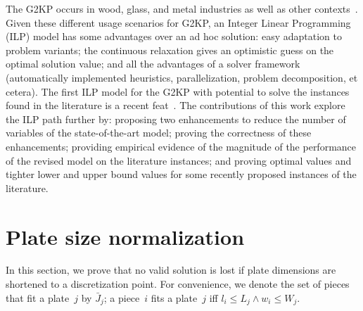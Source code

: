 \documentclass[runningheads]{llncs}
\begin{document}
The G2KP occurs in wood, glass, and metal industries as well as other contexts~\cite[p. 6]{dimitri_thesis}.
Given these different usage scenarios for G2KP, an Integer Linear Programming (ILP) model has some advantages over an ad hoc solution: easy adaptation to problem variants; the continuous relaxation gives an optimistic guess on the optimal solution value; and all the advantages of a solver framework (automatically implemented heuristics, parallelization, problem decomposition, et cetera).
The first ILP model for the G2KP with potential to solve the instances found in the literature is a recent feat~\cite{furini:2016}.
The contributions of this work explore the ILP path further by: proposing two enhancements to reduce the number of variables of the state-of-the-art model; proving the correctness of these enhancements; providing empirical evidence of the magnitude of the performance of the revised model on the literature instances; and proving optimal values and tighter lower and upper bound values for some recently proposed instances of the literature.





\section{Plate size normalization}

In this section, we prove that no valid solution is lost if plate dimensions are shortened to a discretization point.
For convenience, we denote the set of pieces that fit a plate~\(j\) by \(\bar{J}_j\); a piece~\(i\) fits a plate~\(j\) iff \(l_i \leq L_j \land w_i \leq W_j\).%
\end{document}
